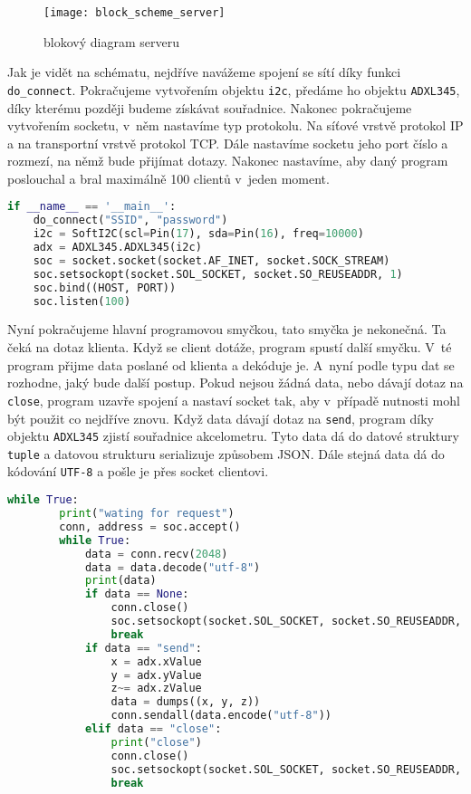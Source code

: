 \documentclass[12pt]{report}			%
\begin{document}
\begin{figure}[h]
\caption{blokový diagram serveru}
\centering
 \texttt{[image: block\_scheme\_server]}
\end{figure}

Jak je vidět na schématu, nejdříve navážeme spojení se sítí díky funkci \texttt{do\_connect}. Pokračujeme vytvořením objektu \texttt{i2c}, předáme ho objektu \texttt{ADXL345}, díky kterému později budeme získávat souřadnice. Nakonec pokračujeme vytvořením socketu, v~něm nastavíme typ protokolu. Na síťové vrstvě protokol IP a na transportní vrstvě protokol TCP. Dále nastavíme socketu jeho port číslo a rozmezí, na němž bude přijímat dotazy. Nakonec nastavíme, aby daný program poslouchal a bral maximálně 100 clientů v~jeden moment. 

\begin{lstlisting}[title={Program server.py}, caption={server.py}, language=Python]
if __name__ == '__main__':
    do_connect("SSID", "password")
    i2c = SoftI2C(scl=Pin(17), sda=Pin(16), freq=10000)
    adx = ADXL345.ADXL345(i2c)
    soc = socket.socket(socket.AF_INET, socket.SOCK_STREAM)
    soc.setsockopt(socket.SOL_SOCKET, socket.SO_REUSEADDR, 1)
    soc.bind((HOST, PORT))
    soc.listen(100)
\end{lstlisting}

Nyní pokračujeme hlavní programovou smyčkou, tato smyčka je nekonečná. Ta čeká na dotaz klienta. Když se client dotáže, program spustí další smyčku. V~té program přijme data poslané od klienta a dekóduje je. A~nyní podle typu dat se rozhodne, jaký bude další postup. Pokud nejsou žádná data, nebo dávají dotaz na \texttt{close}, program uzavře spojení a nastaví socket tak, aby v~případě nutnosti mohl být použit co nejdříve znovu. Když data dávají dotaz na \texttt{send}, program díky objektu \texttt{ADXL345} zjistí souřadnice akcelometru. Tyto data dá do datové struktury \texttt{tuple} a datovou strukturu serializuje způsobem JSON. Dále stejná data dá do kódování \texttt{UTF-8} a pošle je přes socket clientovi. 

\begin{lstlisting}[title={Program server.py}, caption={server.py}, language=Python]
  while True:
        print("wating for request")
        conn, address = soc.accept()
        while True:
            data = conn.recv(2048)
            data = data.decode("utf-8")
            print(data)
            if data == None:
                conn.close()
                soc.setsockopt(socket.SOL_SOCKET, socket.SO_REUSEADDR, 1)
                break
            if data == "send":
                x = adx.xValue
                y = adx.yValue
                z~= adx.zValue
                data = dumps((x, y, z))
                conn.sendall(data.encode("utf-8"))
            elif data == "close":
                print("close")
                conn.close()
                soc.setsockopt(socket.SOL_SOCKET, socket.SO_REUSEADDR, 1)
                break
\end{lstlisting}
\end{document}

